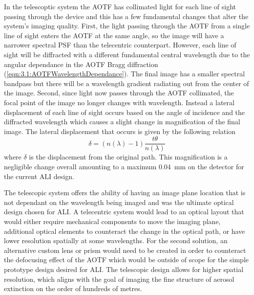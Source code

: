 \documentclass[12pt]{article}
\begin{document}
In the telescoptic system the AOTF has collimated light for each line of sight passing through the device and this has a few fundamental changes that alter the system's imaging 
quality. First, the light passing through the AOTF from a single line of sight enters the AOTF at the same angle, so the image will have a narrower spectral PSF than the 
telecentric counterpart. However, each line of sight will be diffracted with a different fundamental central wavelength due to the angular dependance in the AOTF Bragg 
diffraction (\autoref{eqn:3.1:AOTFWavelengthDependance}). The final image has a smaller spectral bandpass but there will be a wavelength gradient radiating out from the center 
of the image. Second, since light now passes through the AOTF collimated, the focal point of the image no longer changes with wavelength. Instead a lateral displacement of each 
line of sight occurs based on the angle of incidence and the diffracted wavelength which causes a slight change in magnification of the final image. The lateral displacement 
that occurs is given by the following relation
\begin{equation}
    \delta = (n(\lambda)-1)\frac{t\theta}{n(\lambda)}
    \label{eqn:3.2:planeParallelDiplacement}
\end{equation}
where $\delta$ is the displacement from the original path. This magnification is a negligible change overall amounting to a maximum 0.04~mm on the detector for the current ALI 
design.

The telescopic system offers the ability of having an image plane location that is not dependant on the wavelength being imaged and was the ultimate optical design chosen for 
ALI. A telecentric system would lead to an optical layout that would either require mechanical components to move the imaging plane, additional optical elements to counteract 
the change in the optical path, or have lower resolution spatially at some wavelengths. For the second solution, an alternative custom lens or prism would need to be created in 
order to counteract the defocusing effect of the AOTF which would be outside of scope for the simple prototype design desired for ALI. The telescopic design allows for higher 
spatial resolution, which aligns with the goal of imaging the fine structure of aerosol extinction on the order of hundreds of metres.
\end{document}
